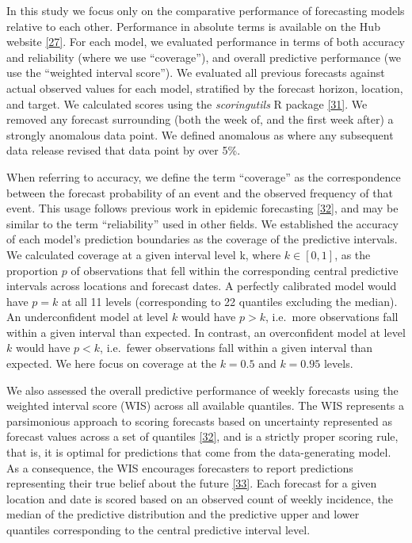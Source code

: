 \documentclass[
]{article}
\begin{document}
In this study we focus only on the comparative performance of forecasting models relative to each other. Performance in absolute terms is available on the Hub website \protect\hyperlink{ref-europeancovid-19forecasthubEuropeanCovid19Forecast}{{[}27{]}}. For each model, we evaluated performance in terms of both accuracy and reliability (where we use ``coverage''), and overall predictive performance (we use the ``weighted interval score''). We evaluated all previous forecasts against actual observed values for each model, stratified by the forecast horizon, location, and target. We calculated scores using the \emph{scoringutils} R package \protect\hyperlink{ref-nikosibosseScoringutilsUtilitiesScoring2020}{{[}31{]}}. We removed any forecast surrounding (both the week of, and the first week after) a strongly anomalous data point. We defined anomalous as where any subsequent data release revised that data point by over 5\%.

When referring to accuracy, we define the term ``coverage'' as the correspondence between the forecast probability of an event and the observed frequency of that event. This usage follows previous work in epidemic forecasting \protect\hyperlink{ref-bracherEvaluatingEpidemicForecasts2021}{{[}32{]}}, and may be similar to the term ``reliability'' used in other fields. We established the accuracy of each model's prediction boundaries as the coverage of the predictive intervals. We calculated coverage at a given interval level k, where \(k\in[0,1]\), as the proportion \(p\) of observations that fell within the corresponding central predictive intervals across locations and forecast dates. A perfectly calibrated model would have \(p=k\) at all 11 levels (corresponding to 22 quantiles excluding the median). An underconfident model at level \(k\) would have \(p>k\), i.e.~more observations fall within a given interval than expected. In contrast, an overconfident model at level \(k\) would have \(p<k\), i.e.~fewer observations fall within a given interval than expected. We here focus on coverage at the \(k=0.5\) and \(k=0.95\) levels.

We also assessed the overall predictive performance of weekly forecasts using the weighted interval score (WIS) across all available quantiles. The WIS represents a parsimonious approach to scoring forecasts based on uncertainty represented as forecast values across a set of quantiles \protect\hyperlink{ref-bracherEvaluatingEpidemicForecasts2021}{{[}32{]}}, and is a strictly proper scoring rule, that is, it is optimal for predictions that come from the data-generating model. As a consequence, the WIS encourages forecasters to report predictions representing their true belief about the future \protect\hyperlink{ref-gneitingStrictlyProperScoring2007}{{[}33{]}}. Each forecast for a given location and date is scored based on an observed count of weekly incidence, the median of the predictive distribution and the predictive upper and lower quantiles corresponding to the central predictive interval level.
\end{document}
